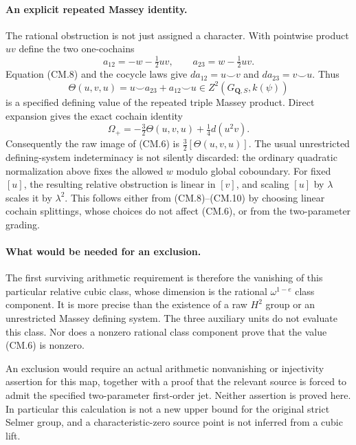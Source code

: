 \paragraph{An explicit repeated Massey identity.}
The rational obstruction is not just assigned a character.
With pointwise product $uv$ define the two one-cochains
\[
 a_{12}=-w-\tfrac12uv,\qquad
 a_{23}=w-\tfrac12uv.
                                                               \tag{CM.19}
\]
Equation (CM.8) and the cocycle laws give
$da_{12}=u\smile v$ and $da_{23}=v\smile u$.
Thus
\[
 \Theta(u,v,u)=u\smile a_{23}+a_{12}\smile u
                      \in Z^2(G_{\mathbf Q,S},k(\psi))
                                                               \tag{CM.20}
\]
is a specified defining value of the repeated triple
Massey product.  Direct expansion gives the exact cochain
identity
\[
             \Omega_+=-\tfrac32\Theta(u,v,u)
                               +\tfrac14d(u^2v).              \tag{CM.21}
\]
Consequently the raw image of (CM.6) is
$\tfrac32[\Theta(u,v,u)]$.
The usual unrestricted defining-system indeterminacy is not
silently discarded: the ordinary quadratic normalization
above fixes the allowed $w$ modulo global coboundary.
For fixed $[u]$, the resulting relative obstruction is linear
in $[v]$, and scaling $[u]$ by $\lambda$ scales it by
$\lambda^2$.  This follows either from (CM.8)--(CM.10) by
choosing linear cochain splittings, whose choices do not
affect (CM.6), or from the two-parameter grading.

\paragraph{What would be needed for an exclusion.}
The first surviving arithmetic requirement is therefore
the vanishing of this particular relative cubic class,
whose dimension is the rational $\omega^{1-e}$ class
component.  It is more precise than the existence of a
raw $H^2$ group or an unrestricted Massey defining system.
The three auxiliary units do not evaluate this class.
Nor does a nonzero rational class component prove that
the value (CM.6) is nonzero.

An exclusion would require an actual arithmetic
nonvanishing or injectivity assertion for this map,
together with a proof that the relevant source is forced
to admit the specified two-parameter first-order jet.
Neither assertion is proved here.  In particular this
calculation is not a new upper bound for the original
strict Selmer group, and a characteristic-zero source
point is not inferred from a cubic lift.

